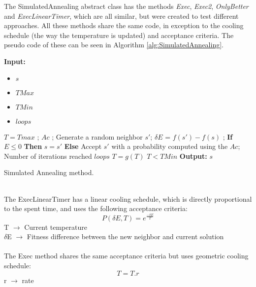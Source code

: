 The SimulatedAnnealing abstract class has the methods \textit{Exec}, \textit{Exec2}, \textit{OnlyBetter} and \textit{ExecLinearTimer}, which are all similar, but were created to test different approaches. All these methods share the same code, in exception to the cooling schedule (the way the temperature is updated) and acceptance criteria. The pseudo code of these can be seen in Algorithm \ref{alg:SimulatedAnnealing}.\\
\begin{algorithm}[b!]
\textbf{Input:} 
\begin{itemize}
	\setlength{\itemsep}{1pt}
	\item $s$ 
	\item $TMax$ 
	\item $TMin$ 
	\item $loops$ 
\end{itemize}
\begin{algorithmic}
\State $T = Tmax$ ; 
\State $Ac$ ; 
\Repeat
	\Repeat	
		\State Generate a random neighbor $s'$;
		\State $\delta E$ = $f(s') - f(s)$ ;
		\State \textbf{If} $E \leq 0$ \textbf{Then} $s = s'$ 
		\State \textbf{Else} Accept $s'$ with a probability computed using the $Ac$;
	\Until Number of iterations reached $loops$
	\State $T = g(T )$ 
\Until $T < TMin$
\State \textbf{Output:} $s$ 
\end{algorithmic}
\caption{Simulated Annealing method.}
\label{alg:SimulatedAnnealing}
\end{algorithm}\\
The ExecLinearTimer has a linear cooling schedule, which is directly proportional to the spent time, and uses the following acceptance criteria:\\
\[P(\delta E, T) = e^{\frac{-\delta E}{T}} \]
T $\rightarrow$ Current temperature\\
$\delta$E $\rightarrow$ Fitness difference between the new neighbor and current solution\\
\\
The Exec method shares the same acceptance criteria but uses geometric cooling schedule:\\
\[T = T.r \]
r $\rightarrow$ rate\\
\\
